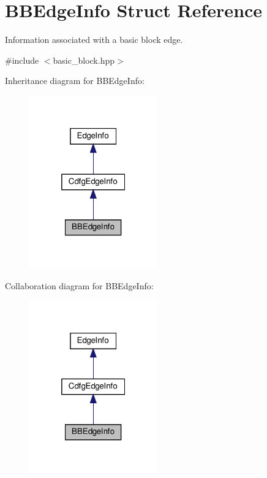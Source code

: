\hypertarget{structBBEdgeInfo}{}\section{B\+B\+Edge\+Info Struct Reference}
\label{structBBEdgeInfo}


Information associated with a basic block edge.  




{\ttfamily \#include $<$basic\+\_\+block.\+hpp$>$}



Inheritance diagram for B\+B\+Edge\+Info\+:
\nopagebreak
\begin{figure}[H]
\begin{center}
\leavevmode
\includegraphics[width=157pt]{da/d58/structBBEdgeInfo__inherit__graph}
\end{center}
\end{figure}


Collaboration diagram for B\+B\+Edge\+Info\+:
\nopagebreak
\begin{figure}[H]
\begin{center}
\leavevmode
\includegraphics[width=157pt]{d1/d57/structBBEdgeInfo__coll__graph}
\end{center}
\end{figure}
